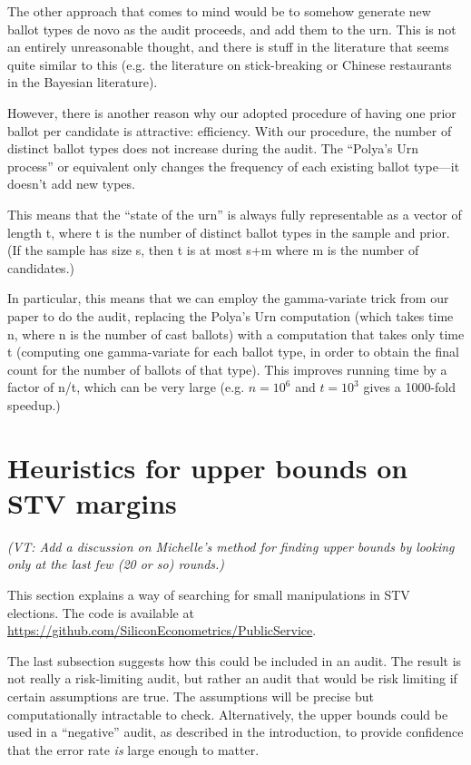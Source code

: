 \documentclass[10pt,a4paper]{article}
\newcommand{\VTNote}[1]{{\it(VT: #1)}}
\begin{document}
The other approach that comes to mind would be to somehow generate
new ballot types de novo as the audit proceeds, and add them to
the urn.  This is not an entirely unreasonable thought, and there
is stuff in the literature that seems quite similar to this (e.g. the
literature on stick-breaking or Chinese restaurants in the Bayesian
literature).

However, there is another reason why our adopted procedure 
of having one prior ballot per candidate is attractive: efficiency.
With our procedure, the number of distinct ballot types does
not increase during the audit.  The ``Polya's Urn process'' or
equivalent only changes the frequency of each existing ballot
type---it doesn't add new types.

This means that the ``state of the urn'' is always fully representable
as a vector of length t, where t is the number of distinct ballot
types in the sample and prior.  (If the sample has size s, then t is at most s+m
where m is the number of candidates.)

In particular, this means that we can employ the gamma-variate
trick from our paper to do the audit, replacing the Polya's Urn
computation (which takes time n, where n is the number of cast
ballots) with a computation that takes only time t (computing
one gamma-variate for each ballot type, in order to obtain the
final count for the number of ballots of that type).  This improves
running time by a factor of n/t, which can be very large (e.g.
$n=10^6$ and $t=10^3$ gives a 1000-fold speedup.)




\section{Heuristics for upper bounds on STV margins}  \label{sec:winnerElimination}
\VTNote{Add a discussion on Michelle's method for finding upper bounds by looking only at the last few (20 or so) rounds.}

This section explains a way of searching for small manipulations in STV elections.  The code is available at 
\url{https://github.com/SiliconEconometrics/PublicService}.

The last subsection suggests how this could be included in an audit.  The result is not really a risk-limiting audit, but rather an audit that would be risk limiting if certain assumptions are true.  The assumptions will be precise but computationally intractable to check.   Alternatively, the upper bounds could be used in a ``negative'' audit, as described in the introduction, to provide confidence that the error rate \emph{is} large enough to matter.
\end{document}
